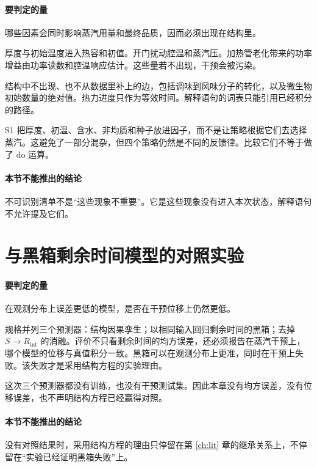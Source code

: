 \paragraph{要判定的量}
哪些因素会同时影响蒸汽用量和最终品质，因而必须出现在结构里。

厚度与初始温度进入热容和初值。开门扰动腔温和蒸汽压。加热管老化带来的功率增益由功率读数和腔温响应估计。这些量若不出现，干预会被污染。

结构中不出现、也不从数据里补上的边，包括调味到风味分子的转化，以及微生物初始数量的绝对值。热力进度只作为等效时间。解释语句的词表只能引用已经积分的路径。

S1 把厚度、初温、含水、非均质和种子放进因子，而不是让策略根据它们去选择蒸汽。这避免了一部分混杂，但四个策略仍然是不同的反馈律。比较它们不等于做了 do 运算。

\paragraph{本节不能推出的结论}
不可识别清单不是“这些现象不重要”。它是这些现象没有进入本次状态，解释语句不允许提及它们。

\section{与黑箱剩余时间模型的对照实验}

\paragraph{要判定的量}
在观测分布上误差更低的模型，是否在干预位移上仍然更低。

规格并列三个预测器：结构因果孪生；以相同输入回归剩余时间的黑箱；去掉 \(S\to R_{\mathrm{int}}\) 的消融。评价不只看剩余时间的均方误差，还必须报告在蒸汽干预上，哪个模型的位移与真值积分一致。黑箱可以在观测分布上更准，同时在干预上失败。该失败才是采用结构方程的实验理由。

这次三个预测器都没有训练，也没有干预测试集。因此本章没有均方误差，没有位移误差，也不声明结构方程已经赢得对照。

\paragraph{本节不能推出的结论}
没有对照结果时，采用结构方程的理由只停留在第 \ref{ch:lit} 章的继承关系上，不停留在“实验已经证明黑箱失败”上。
